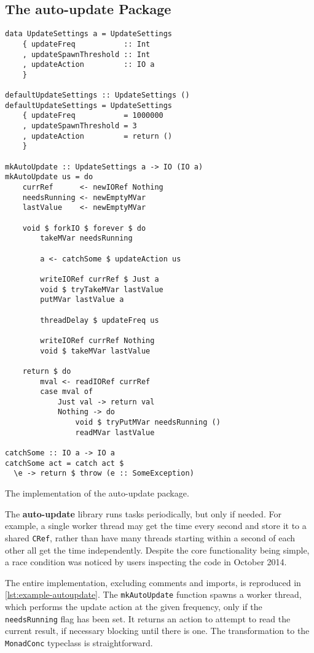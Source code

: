 \subsection{The auto-update Package}

\begin{listing}
  \begin{verbatim}
data UpdateSettings a = UpdateSettings
    { updateFreq           :: Int
    , updateSpawnThreshold :: Int
    , updateAction         :: IO a
    }

defaultUpdateSettings :: UpdateSettings ()
defaultUpdateSettings = UpdateSettings
    { updateFreq           = 1000000
    , updateSpawnThreshold = 3
    , updateAction         = return ()
    }

mkAutoUpdate :: UpdateSettings a -> IO (IO a)
mkAutoUpdate us = do
    currRef      <- newIORef Nothing
    needsRunning <- newEmptyMVar
    lastValue    <- newEmptyMVar

    void $ forkIO $ forever $ do
        takeMVar needsRunning

        a <- catchSome $ updateAction us

        writeIORef currRef $ Just a
        void $ tryTakeMVar lastValue
        putMVar lastValue a

        threadDelay $ updateFreq us

        writeIORef currRef Nothing
        void $ takeMVar lastValue

    return $ do
        mval <- readIORef currRef
        case mval of
            Just val -> return val
            Nothing -> do
                void $ tryPutMVar needsRunning ()
                readMVar lastValue

catchSome :: IO a -> IO a
catchSome act = catch act $
  \e -> return $ throw (e :: SomeException)
  \end{verbatim}
  \caption{The implementation of the auto-update package.}\label{lst:example-autoupdate}
\end{listing}

The \textbf{auto-update} library runs tasks periodically, but only if
needed.  For example, a single worker thread may get the time every
second and store it to a shared \verb|CRef|, rather than have many
threads starting within a second of each other all get the time
independently.  Despite the core functionality being simple, a race
condition was noticed by users inspecting the code in October 2014.

The entire implementation, excluding comments and imports, is
reproduced in \cref{lst:example-autoupdate}.  The \verb|mkAutoUpdate|
function spawns a worker thread, which performs the update action at
the given frequency, only if the \verb|needsRunning| flag has been
set.  It returns an action to attempt to read the current result, if
necessary blocking until there is one.  The transformation to the
\verb|MonadConc| typeclass is straightforward.

